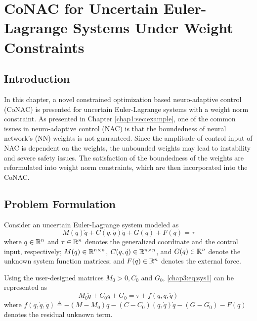 
\chapter{
    CoNAC for Uncertain Euler-Lagrange Systems Under Weight Constraints
} \label{chapter3}

\section{Introduction} 

In this chapter, a novel constrained optimization based neuro-adaptive control (CoNAC) is presented for uncertain Euler-Lagrange systems with a weight norm constraint. 
As presented in Chapter \ref{chap1:sec:example}, one of the common issues in neuro-adaptive control (NAC) is that the boundedness of neural network’s (NN) weights is not guaranteed.
Since the amplitude of control input of NAC is dependent on the weights, the unbounded weights may lead to instability and severe safety issues. 
The satisfaction of the boundedness of the weights are reformulated into weight norm constraints, which are then incorporated into the CoNAC.

\section{Problem Formulation}

Consider an uncertain Euler-Lagrange system modeled as
\begin{equation}
    M(q)\ddot q + C(q,\dot q)\dot q + G(q) + F(q) = \tau
    \label{chap3:eq:sys1}
\end{equation}
where $q\in \mathbb{R}^n$ and $\tau\in\mathbb{R}^n$ denotes the generalized coordinate and the control input, respectively; $M(q)\in\mathbb{R}^{n\times n}$, $C(q,\dot q)\in\mathbb{R}^{n\times n}$, and $G(q)\in\mathbb{R}^{n}$ denote the unknown system function matrices; and $F(q)\in\mathbb{R}^{n}$ denotes the external force.

Using the user-designed matrices $M_0>0,C_0$ and $G_0$, \eqref{chap3:eq:sys1} can be represented as 
\begin{equation}
    M_0\ddot q+C_0\dot q+G_0 = \tau + f(q,\dot q,\ddot q)
    \label{chap3:eq:sys2}
\end{equation}
where $f(q,\dot q,\ddot q) \triangleq -(M-M_0)\ddot q-(C-C_0)(q,\dot q)\dot q -(G-G_0) -F(q)$ denotes the residual unknown term.

